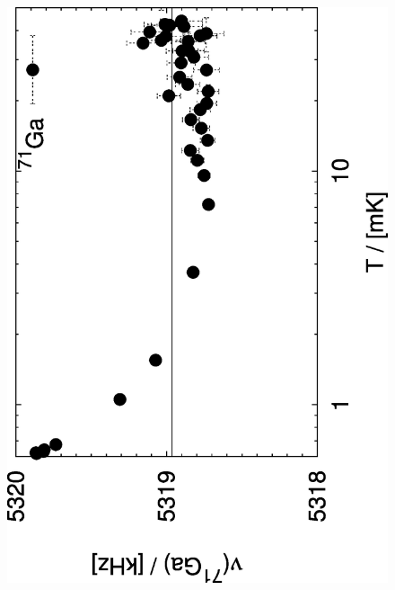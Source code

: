 \begin{figure}[htp]
\begin{center}
		\includegraphics[angle=-90,width=\ssmallwidth]{plots/knight_aug1197da_4}\\

\end{center}
\end{figure}
